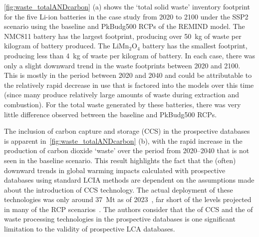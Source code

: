 \documentclass[a4paper,fleqn]{cas-dc}
\begin{document}
\autoref{fig:waste_totalANDcarbon} (a) shows the `total solid waste' inventory footprint for the five Li-ion batteries in the case study from 2020 to 2100 under the SSP2 scenario using the baseline and PkBudg500 RCPs of the REMIND model. The NMC811 battery has the largest footprint, producing over 50~kg of waste per kilogram of battery produced. The  LiMn\(_2\)O\(_4\) battery has the smallest footprint, producing less than 4~kg of waste per kilogram of battery. In each case, there was only a slight downward trend in the waste footprints between 2020 and 2100. This is mostly in the period between 2020 and 2040 and could be attributable to the relatively rapid decrease in \protect{} \protect{} use that is factored into the models over this time (since many produce relatively large amounts of waste during extraction and combustion). For the total waste generated by these batteries, there was very little difference observed between the baseline and PkBudg500 RCPs.

The inclusion of carbon capture and storage (CCS) in the prospective databases
is apparent in~\autoref{fig:waste_totalANDcarbon} (b), with the rapid increase
in the production of carbon dioxide `waste' over the period from 2020--2040
that is not seen in the baseline scenario. This result highlights the fact that
the (often) downward trends in global warming impacts calculated with
prospective databases using standard LCIA methods are dependent on the
assumptions made about the introduction of CCS technology. The actual
deployment of these technologies was only around 37~Mt \protect{} \protect{} as of
2023~\citep{dziejarski2023ccs}, far short of the levels projected in many of
the RCP scenarios~\citep{sacchi2023premisedocs}. The authors consider that the \protect{}
\protect{} of CCS and the \protect{} \protect{} of waste processing
technologies in the prospective databases is one significant limitation to the
validity of prospective LCA databases.
\end{document}
